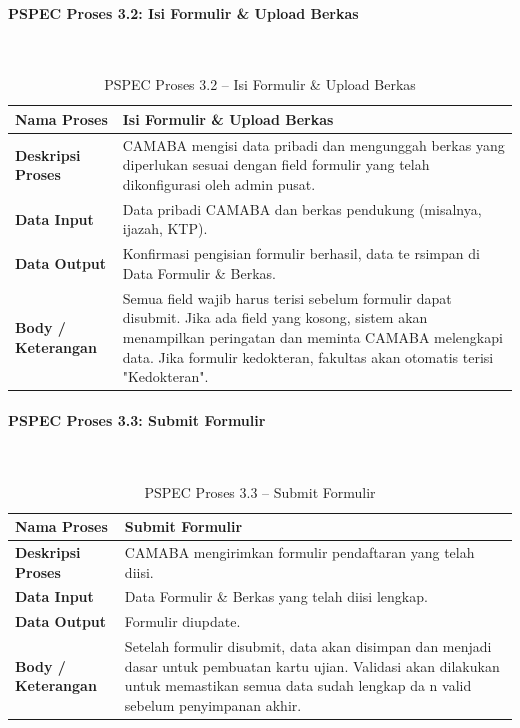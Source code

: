 \paragraph{PSPEC Proses 3.2: Isi Formulir \& Upload Berkas}~\\
\begin{longtable}{|p{}|p{}|}
	\caption{PSPEC Proses 3.2 -- Isi Formulir \& Upload Berkas}
	\label{table:3.pspec32}\\
	\hline
	\textbf{Nama Proses} & Isi Formulir \& Upload Berkas \\
	\hline
	\textbf{Deskripsi Proses} & CAMABA mengisi data pribadi dan mengunggah berkas yang diperlukan sesuai dengan field formulir yang telah dikonfigurasi oleh admin pusat. \\
	\hline
	\textbf{Data Input} & Data pribadi CAMABA dan berkas pendukung (misalnya, ijazah, KTP). \\
	\hline
	\textbf{Data Output} & Konfirmasi pengisian formulir berhasil, data te rsimpan di Data Formulir \& Berkas. \\
	\hline
	\textbf{Body / Keterangan} & Semua field wajib harus terisi sebelum formulir dapat disubmit. Jika ada field yang kosong, sistem akan menampilkan peringatan dan meminta CAMABA melengkapi data. Jika formulir kedokteran, fakultas akan otomatis terisi "Kedokteran". \\
	\hline
\end{longtable}

\paragraph{PSPEC Proses 3.3: Submit Formulir}~\\
\begin{longtable}{|p{}|p{}|}
	\caption{PSPEC Proses 3.3 -- Submit Formulir}
	\label{table:3.pspec33}\\
	\hline
	\textbf{Nama Proses} & Submit Formulir \\
	\hline
	\textbf{Deskripsi Proses} & CAMABA mengirimkan formulir pendaftaran yang telah diisi. \\
	\hline
	\textbf{Data Input} & Data Formulir \& Berkas yang telah diisi lengkap. \\
	\hline
	\textbf{Data Output} & Formulir diupdate. \\
	\hline
	\textbf{Body / Keterangan} & Setelah formulir disubmit, data akan disimpan dan menjadi dasar untuk pembuatan kartu ujian. Validasi akan dilakukan untuk memastikan semua data sudah lengkap da n valid sebelum penyimpanan akhir. \\
	\hline
\end{longtable}


